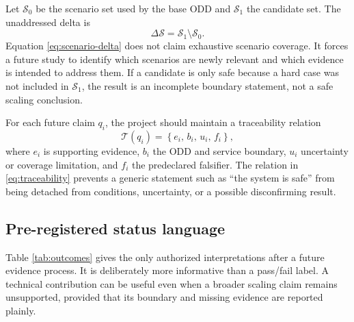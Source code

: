 \documentclass[conference]{../../../../Conference-LaTeX-template_10-17-19/IEEEtran}
\begin{document}
Let $\mathcal{S}_0$ be the scenario set used by the base ODD and $\mathcal{S}_1$ the candidate set. The unaddressed delta is
\begin{equation}
\Delta\mathcal{S}=\mathcal{S}_1\setminus\mathcal{S}_0.
\label{eq:scenario-delta}
\end{equation}
Equation \eqref{eq:scenario-delta} does not claim exhaustive scenario coverage. It forces a future study to identify which scenarios are newly relevant and which evidence is intended to address them. If a candidate is only safe because a hard case was not included in $\mathcal{S}_1$, the result is an incomplete boundary statement, not a safe scaling conclusion.

For each future claim $q_i$, the project should maintain a traceability relation
\begin{equation}
\mathcal{T}(q_i)=\left\{e_i,\,b_i,\,u_i,\,f_i\right\},
\label{eq:traceability}
\end{equation}
where $e_i$ is supporting evidence, $b_i$ the ODD and service boundary, $u_i$ uncertainty or coverage limitation, and $f_i$ the predeclared falsifier. The relation in \eqref{eq:traceability} prevents a generic statement such as ``the system is safe'' from being detached from conditions, uncertainty, or a possible disconfirming result.

\subsection{Pre-registered status language}
Table \ref{tab:outcomes} gives the only authorized interpretations after a future evidence process. It is deliberately more informative than a pass/fail label. A technical contribution can be useful even when a broader scaling claim remains unsupported, provided that its boundary and missing evidence are reported plainly.
\end{document}

